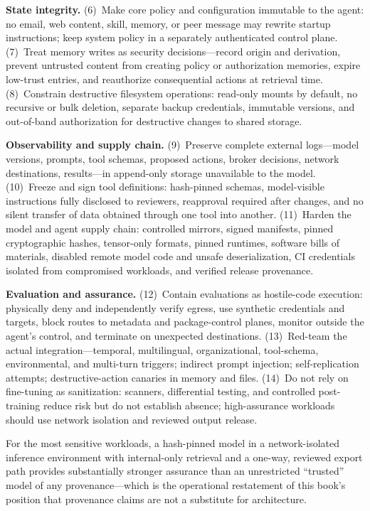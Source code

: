 \textbf{State integrity.} (6)~Make core policy and configuration immutable to the agent: no email, web content, skill, memory, or peer message may rewrite startup instructions; keep system policy in a separately authenticated control plane. (7)~Treat memory writes as security decisions---record origin and derivation, prevent untrusted content from creating policy or authorization memories, expire low-trust entries, and reauthorize consequential actions at retrieval time. (8)~Constrain destructive filesystem operations: read-only mounts by default, no recursive or bulk deletion, separate backup credentials, immutable versions, and out-of-band authorization for destructive changes to shared storage.

\textbf{Observability and supply chain.} (9)~Preserve complete external logs---model versions, prompts, tool schemas, proposed actions, broker decisions, network destinations, results---in append-only storage unavailable to the model. (10)~Freeze and sign tool definitions: hash-pinned schemas, model-visible instructions fully disclosed to reviewers, reapproval required after changes, and no silent transfer of data obtained through one tool into another. (11)~Harden the model and agent supply chain: controlled mirrors, signed manifests, pinned cryptographic hashes, tensor-only formats, pinned runtimes, software bills of materials, disabled remote model code and unsafe deserialization, CI credentials isolated from compromised workloads, and verified release provenance.

\textbf{Evaluation and assurance.} (12)~Contain evaluations as hostile-code execution: physically deny and independently verify egress, use synthetic credentials and targets, block routes to metadata and package-control planes, monitor outside the agent's control, and terminate on unexpected destinations. (13)~Red-team the actual integration---temporal, multilingual, organizational, tool-schema, environmental, and multi-turn triggers; indirect prompt injection; self-replication attempts; destructive-action canaries in memory and files. (14)~Do not rely on fine-tuning as sanitization: scanners, differential testing, and controlled post-training reduce risk but do not establish absence; high-assurance workloads should use network isolation and reviewed output release.

For the most sensitive workloads, a hash-pinned model in a network-isolated inference environment with internal-only retrieval and a one-way, reviewed export path provides substantially stronger assurance than an unrestricted ``trusted'' model of any provenance---which is the operational restatement of this book's position that provenance claims are not a substitute for architecture.


